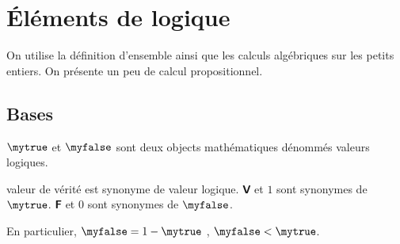 
\section{Éléments de logique}
On utilise la définition d'ensemble ainsi que les calculs algébriques sur les petits entiers. On présente un peu de
calcul propositionnel.

\subsection{Bases}
\begin{axiom}
[Proposition]
\(\mytrue\) et \(\myfalse\) sont deux objects mathématiques dénommés valeurs logiques.
\end{axiom}
\begin{vocabulary}
\par\noindent
\begin{itemize}
\itemrnd
valeur de vérité est synonyme de valeur logique.
\itemrnd
\(𝗩\) et \(1\) sont synonymes de \(\mytrue\).
\itemrnd
\(𝗙\) et \(0\) sont synonymes de \(\myfalse\).
\end{itemize}
\end{vocabulary}
En particulier, \(\myfalse=1-\mytrue\) ,
\(\myfalse<\mytrue\).

